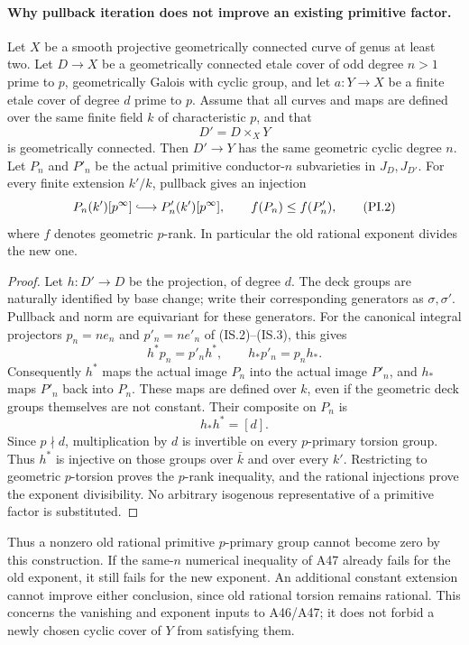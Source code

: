 \paragraph{Why pullback iteration does not improve an existing primitive factor.}
Let $X$ be a smooth projective geometrically connected curve
of genus at least two. Let $D\to X$ be a geometrically connected
etale cover of odd degree $n>1$ prime to $p$, geometrically
Galois with cyclic group, and let $a:Y\to X$ be a finite etale
cover of degree $d$ prime to $p$.
Assume that all curves and maps are defined over the same finite
field $k$ of characteristic $p$, and that
\[
                         D'=D\times_XY
 \tag{PI.1}
\]
is geometrically connected. Then $D'\to Y$ has the same
geometric cyclic degree $n$. Let $P_n$ and $P'_n$ be the
actual primitive conductor-$n$ subvarieties in $J_D,J_{D'}$.
For every finite extension $k'/k$, pullback gives an injection
\[
             P_n(k')[p^\infty]\lhook\joinrel\longrightarrow
                              P'_n(k')[p^\infty],
 \qquad
             f(P_n)\le f(P'_n),
 \tag{PI.2}
\]
where $f$ denotes geometric $p$-rank. In particular the old
rational exponent divides the new one.

\begin{proof}
Let $h:D'\to D$ be the projection, of degree $d$.
The deck groups are naturally identified by base change;
write their corresponding generators as $\sigma,\sigma'$.
Pullback and norm are equivariant for these generators.
For the canonical integral projectors $p_n=ne_n$ and
$p'_n=ne'_n$ of (IS.2)--(IS.3), this gives
\[
 h^*p_n=p'_nh^*,\qquad h_*p'_n=p_nh_*.
 \tag{PI.3}
\]
Consequently $h^*$ maps the actual image $P_n$ into the actual
image $P'_n$, and $h_*$ maps $P'_n$ back into $P_n$.
These maps are defined over $k$, even if the geometric deck
groups themselves are not constant. Their composite on $P_n$ is
\[
                          h_*h^*=[d].
 \tag{PI.4}
\]
Since $p\nmid d$, multiplication by $d$ is invertible on every
$p$-primary torsion group. Thus $h^*$ is injective on those
groups over $\bar k$ and over every $k'$. Restricting to
geometric $p$-torsion proves the $p$-rank inequality, and
the rational injections prove the exponent divisibility.
No arbitrary isogenous representative of a primitive factor
is substituted.
\end{proof}

Thus a nonzero old rational primitive $p$-primary group cannot
become zero by this construction. If the same-$n$ numerical
inequality of A47 already fails for the old exponent, it still
fails for the new exponent. An additional constant extension
cannot improve either conclusion, since old rational torsion
remains rational. This concerns the vanishing and exponent
inputs to A46/A47; it does not forbid a newly chosen cyclic
cover of $Y$ from satisfying them.

